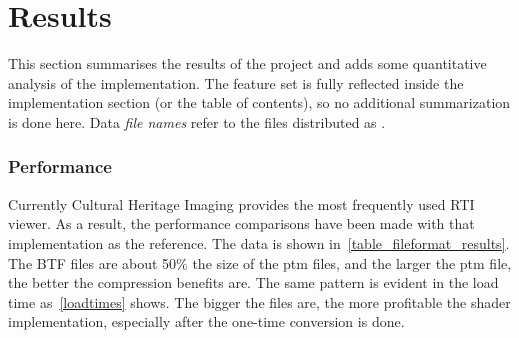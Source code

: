 \section{Results}
This section summarises the results of the project and adds some quantitative
analysis of the implementation. The feature set is fully reflected inside the
implementation section (or the table of contents), so no additional
summarization is done here. Data \emph{file names} refer to the files distributed as \cite*{noauthor_oxrti_data:_2018}.

\subsubsection{Performance}
Currently Cultural Heritage Imaging provides the most frequently used RTI viewer\cite*{noauthor_cultural_nodate-1}. As a result, the performance comparisons have been made with that implementation as the reference. The data is shown
in~\autoref{table_fileformat_results}. The BTF files are about 50\% the size of
the ptm files, and the larger the ptm file, the better the compression benefits are.
The same pattern is evident in the load time as~\autoref{loadtimes} shows. The
bigger the files are, the more profitable the shader implementation, especially
after the one-time conversion is done.

